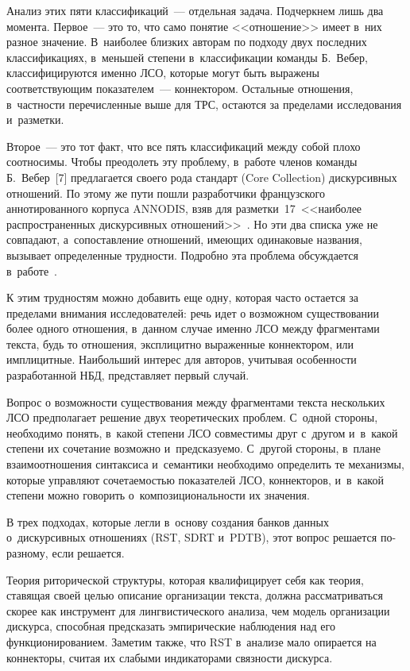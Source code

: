 \begin{multicols}{2}
  Анализ этих пяти классификаций~--- отдельная задача. Подчеркнем лишь два 
момента. Первое~--- это то, что само понятие <<отношение>> имеет в~них 
разное значение. В~наиболее близких авторам по подходу двух последних 
классификациях, в~меньшей степени в~классификации команды Б.~Вебер, 
классифицируются именно ЛСО, которые могут быть выражены 
соответствующим показателем~--- коннектором. Остальные отношения, 
в~частности перечисленные выше для ТРС, остаются за пределами 
исследования и~разметки.
  
  Второе~--- это тот факт, что все пять классификаций между собой плохо 
соотносимы. Чтобы преодолеть эту проблему, в~работе членов команды 
Б.~Вебер~[7] предлагается своего рода стандарт (Core Collection) дискурсивных 
отношений. По этому же пути пошли разработчики французского 
аннотированного корпуса ANNODIS, взяв для разметки~17~<<наиболее 
распространенных дискурсивных отношений>>~\cite[с.~2651]{8-in}. Но эти два 
списка уже не совпадают, а~сопоставление отношений, име\-ющих одинаковые 
названия, вызывает определенные трудности. Подробно эта проблема 
обсуждается в~работе~\cite{3-in}.
  
  К этим трудностям можно добавить еще одну, которая часто остается за 
пределами внимания исследователей: речь идет о возможном существовании 
более одного отношения, в~данном случае именно ЛСО между фрагментами 
текста, будь то отношения, эксплицитно выраженные коннектором, или 
имплицитные. Наибольший интерес для авторов, учитывая особенности 
разработанной НБД, представляет первый случай.
  
  Вопрос о возможности существования между фрагментами текста 
нескольких ЛСО предполагает решение двух теоретических проблем. С~одной 
стороны, необходимо понять, в~какой степени ЛСО совместимы друг с~другом 
и~в~какой степени их сочетание возможно и~предсказуемо. С~другой стороны, 
в~плане взаимоотношения синтаксиса и~семантики необходимо определить те 
механизмы, которые управляют сочетаемостью показателей ЛСО, коннекторов, 
и~в~какой степени можно говорить о~композициональности их значения.
  
  В трех подходах, которые легли в~основу создания банков данных 
о~дискурсивных отношениях (RST, SDRT и~PDTB), этот вопрос решается  
по-раз\-но\-му, если решается.
  
  Теория риторической структуры, которая квалифицирует себя как теория, ставящая своей целью 
описание организации текста, должна рассматриваться скорее как инструмент 
для лингвистического анализа, чем модель организации дискурса, способная 
предсказать эмпирические наблюдения над его функционированием. Заметим 
также, что RST в~анализе мало опирается на коннекторы, считая их слабыми 
индикаторами связности дискурса.
  

\end{multicols}
